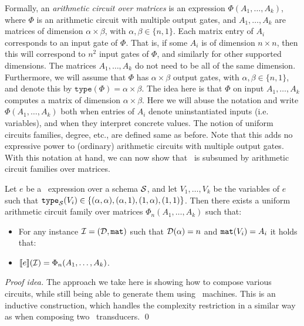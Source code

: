 Formally, an {\em arithmetic circuit over matrices} is an expression $\Phi(A_1,\ldots ,A_k)$, where $\Phi$ is an arithmetic circuit with multiple output gates, and $A_1,\ldots ,A_k$ are matrices of dimension $\alpha\times \beta$, with $\alpha,\beta \in \{n,1\}$. Each matrix entry of $A_i$ corresponds to an input gate of $\Phi$. That is, if some $A_i$ is of dimension $n\times n$, then this will correspond to $n^2$ input gates of $\Phi$, and similarly for other supported dimensions. The matrices $A_1,\ldots ,A_k$ do not need to be all of the same dimension. Furthermore, we will assume that $\Phi$ has $\alpha\times \beta$ output gates, with $\alpha,\beta \in \{n,1\}$, and denote this by $\mathtt{type}(\Phi) = \alpha \times \beta$. The idea here is that $\Phi$ on input $A_1,\ldots ,A_k$ computes a matrix of dimension $\alpha\times \beta$. Here we will abuse the notation and write $\Phi(A_1,\ldots ,A_k)$ both when entries of $A_i$ denote uninstantiated inputs (i.e. variables), and when they interpret concrete values. The notion of uniform circuits families, degree, etc., are defined same as before. Note that this adds no expressive power to (ordinary) arithmetic circuits with multiple output gates. With this notation at hand, we can now show that \langfor\ is subsumed by arithmetic circuit families over matrices.


\begin{theorem}
\label{th-ml-to-circuits}
Let $e$ be a \langfor\ expression over a schema $\mathcal{S}$, and let $V_1,\ldots ,V_k$ be the variables of $e$ such that $\texttt{type}_{\mathcal{S}}(V_i)\in \{(\alpha,\alpha), (\alpha,1), (1,\alpha), (1,1)\}$. Then there exists a uniform arithmetic circuit family over matrices $\Phi_n(A_1,\ldots ,A_k)$ such that:
\begin{itemize}
\item For any instance $\mathcal{I} = (\mathcal{D},\texttt{mat})$ such that $\mathcal{D}(\alpha) = n$ and $\texttt{mat}(V_i) = A_i$ it holds that:
\item $\llbracket e \rrbracket(\mathcal{I}) = \Phi_n(A_1,\ldots ,A_k)$.
\end{itemize}
\end{theorem}

{\em Proof idea.} The approach we take here is showing how to compose various circuits, while still being able to generate them using \logspace\ machines. This is an inductive construction, which handles the complexity restriction in a similar way as when composing two \logspace\ transducers. \qed

